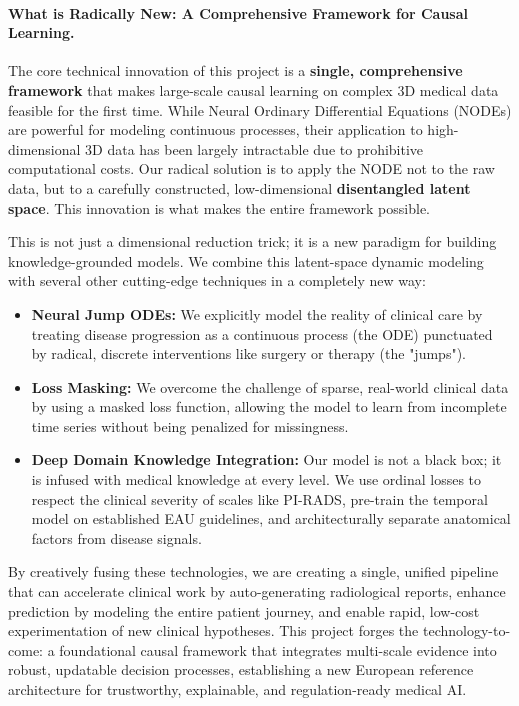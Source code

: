 \documentclass[11pt, a4paper]{article}
\begin{document}
\paragraph{What is Radically New: A Comprehensive Framework for Causal Learning.}
The core technical innovation of this project is a \textbf{single, comprehensive framework} that makes large-scale causal learning on complex 3D medical data feasible for the first time. While Neural Ordinary Differential Equations (NODEs) are powerful for modeling continuous processes, their application to high-dimensional 3D data has been largely intractable due to prohibitive computational costs. Our radical solution is to apply the NODE not to the raw data, but to a carefully constructed, low-dimensional \textbf{disentangled latent space}. This innovation is what makes the entire framework possible.

This is not just a dimensional reduction trick; it is a new paradigm for building knowledge-grounded models. We combine this latent-space dynamic modeling with several other cutting-edge techniques in a completely new way:
\begin{itemize}
    \item \textbf{Neural Jump ODEs:} We explicitly model the reality of clinical care by treating disease progression as a continuous process (the ODE) punctuated by radical, discrete interventions like surgery or therapy (the "jumps").
    \item \textbf{Loss Masking:} We overcome the challenge of sparse, real-world clinical data by using a masked loss function, allowing the model to learn from incomplete time series without being penalized for missingness.
    \item \textbf{Deep Domain Knowledge Integration:} Our model is not a black box; it is infused with medical knowledge at every level. We use ordinal losses to respect the clinical severity of scales like PI-RADS, pre-train the temporal model on established EAU guidelines, and architecturally separate anatomical factors from disease signals.
\end{itemize}

By creatively fusing these technologies, we are creating a single, unified pipeline that can accelerate clinical work by auto-generating radiological reports, enhance prediction by modeling the entire patient journey, and enable rapid, low-cost experimentation of new clinical hypotheses. This project forges the technology-to-come: a foundational causal framework that integrates multi-scale evidence into robust, updatable decision processes, establishing a new European reference architecture for trustworthy, explainable, and regulation-ready medical AI.
\end{document}
